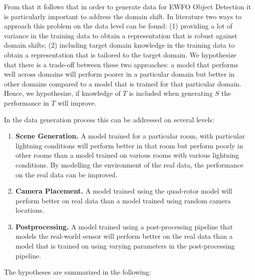From that it follows that in order to generate data for \ac{EWFO} Object Detection it is particularly important to address the domain shift. In literature two ways to approach this problem on the data level can be found: (1) providing a lot of variance in the training data to obtain a representation that is robust against domain shifts; (2) including target domain knowledge in the training data to obtain a representation that is tailored to the target domain. We hypothesize that there is a trade-off between these two approaches: a model that performs well across domains will perform poorer in a particular domain but better in other domains compared to a model that is trained for that particular domain. Hence, we hypothesize, if knowledge of $T$ is included when generating $S$ the performance in $T$ will improve.

In the data generation process this can be addressed on several levels:

\begin{enumerate}
	\item \textbf{Scene Generation.} A model trained for a particular room, with particular lightning conditions will perform better in that room but perform poorly in other rooms than a model trained on various rooms with various lightning conditions. By modelling the environment of the real data, the performance on the real data can be improved.
	
	\item \textbf{Camera Placement.} A model trained using the quad-rotor model will perform better on real data than a model trained using random camera locations.
	
	\item \textbf{Postprocessing.} A model trained using a post-processing pipeline that models the real-world sensor will perform better on the real data than a model that is trained on using varying parameters in the post-processing pipeline.  
\end{enumerate}

The hypotheses are summarized in the following:

